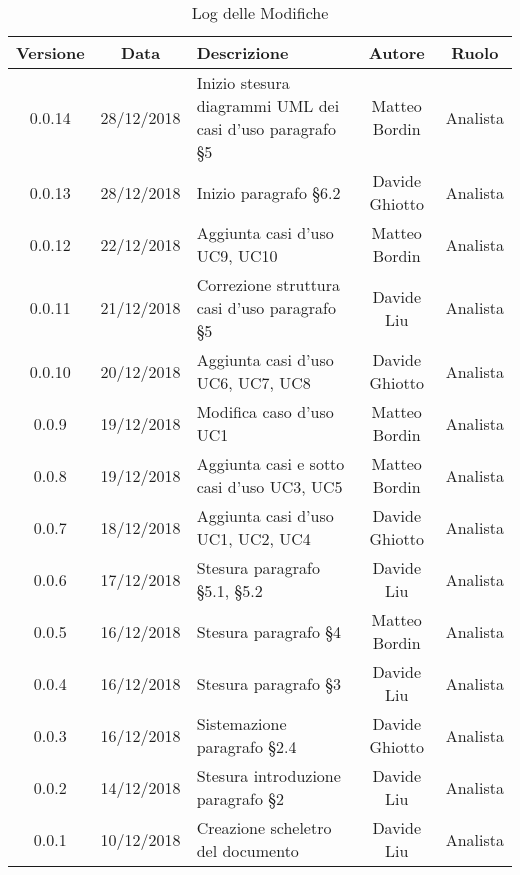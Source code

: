 \begin{table}[h!] %
            \centering
            \renewcommand{\arraystretch}{2}
            \begin{tabular}{|c|c|p{5cm}|c|c|} %
                \rowcolor{orange!50} %
        		\hline
        		\textbf{Versione} & \textbf{Data} & \textbf{Descrizione} & \textbf{Autore} & \textbf{Ruolo} \\
                \hline
                0.0.14 & 28/12/2018 & Inizio stesura diagrammi UML dei casi d'uso paragrafo §5 & Matteo Bordin & Analista \\
                \hline
                0.0.13 & 28/12/2018 & Inizio paragrafo §6.2 & Davide Ghiotto & Analista \\
                \hline
                0.0.12 & 22/12/2018 & Aggiunta casi d’uso UC9, UC10 & Matteo Bordin & Analista \\
                \hline
                0.0.11 & 21/12/2018 & Correzione struttura casi d’uso paragrafo §5 & Davide Liu & Analista \\
                \hline
                0.0.10 & 20/12/2018 & Aggiunta casi d’uso UC6, UC7, UC8 & Davide Ghiotto & Analista \\
                \hline
                0.0.9 & 19/12/2018 & Modifica caso d’uso UC1 & Matteo Bordin & Analista \\
                \hline
                0.0.8 & 19/12/2018 & Aggiunta casi e sotto casi d’uso UC3, UC5 & Matteo Bordin & Analista \\
                \hline
                0.0.7 & 18/12/2018 & Aggiunta casi d’uso UC1, UC2, UC4 & Davide Ghiotto & Analista \\
                \hline
                0.0.6 & 17/12/2018 & Stesura paragrafo §5.1, §5.2 & Davide Liu & Analista \\
                \hline
                0.0.5 & 16/12/2018 & Stesura paragrafo §4 & Matteo Bordin & Analista \\
                \hline
                0.0.4 & 16/12/2018 & Stesura paragrafo §3 & Davide Liu & Analista \\
                \hline
                0.0.3 & 16/12/2018 & Sistemazione  paragrafo §2.4 & Davide Ghiotto & Analista \\
                \hline 
                0.0.2 & 14/12/2018 & Stesura introduzione paragrafo §2 & Davide Liu & Analista \\
                \hline
                0.0.1 & 10/12/2018 & Creazione scheletro del documento & Davide Liu & Analista \\
                \hline
                
                
                
                
        \end{tabular}
        \caption{Log delle Modifiche} %
        \label{tab:Log delle modifiche2}
\end{table}
